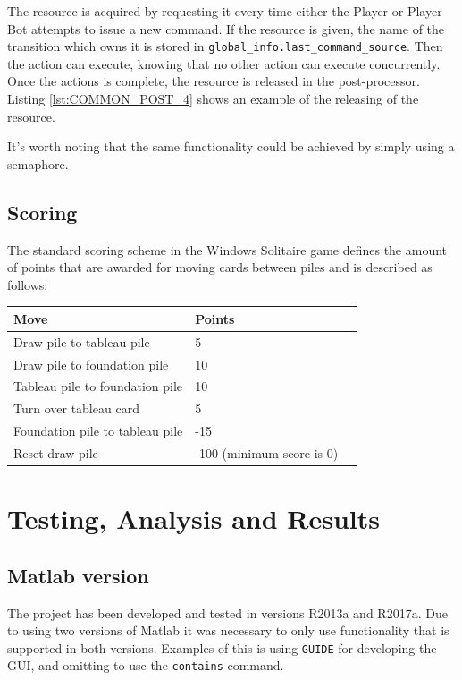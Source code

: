 \documentclass[runningheads,a4paper]{llncs}
\newcommand{\GPenSIM}{../GPenSIM}
\begin{document}
The resource is acquired by requesting it every time either the Player or Player Bot attempts to issue a new command. If the resource is given, the name of the transition which owns it is stored in \verb!global_info.last_command_source!. Then the action can execute, knowing that no other action can execute concurrently. Once the actions is complete, the resource is released in the post-processor. Listing \ref{lst:COMMON_POST_4} shows an example of the releasing of the resource.


It's worth noting that the same functionality could be achieved by simply using a semaphore.
\subsection{Scoring}
The standard scoring scheme in the Windows Solitaire game defines the amount of points that are awarded for moving cards between piles and is described as follows:
\begin{center}
	\begin{tabular}{ | l | l | l | }
		\hline
		Move & Points \\ \hline
		Draw pile to tableau pile & 5  \\ \hline
		Draw pile to foundation pile & 10 \\ \hline
		Tableau pile to foundation pile & 10  \\ \hline
		Turn over tableau card & 5 \\ \hline
		Foundation pile to tableau pile & -15 \\ \hline
		Reset draw pile & -100 (minimum score is 0) \\ \hline
	\end{tabular}
\end{center}


\section{Testing, Analysis and Results}
\label{sec:4_testing_analysis}
\subsection{Matlab version}
The project has been developed and tested in versions R2013a and R2017a. Due to using two versions of Matlab it was necessary to only use functionality that is supported in both versions. Examples of this is using \verb!GUIDE! for developing the GUI, and omitting to use the \verb!contains! command.
\end{document}
